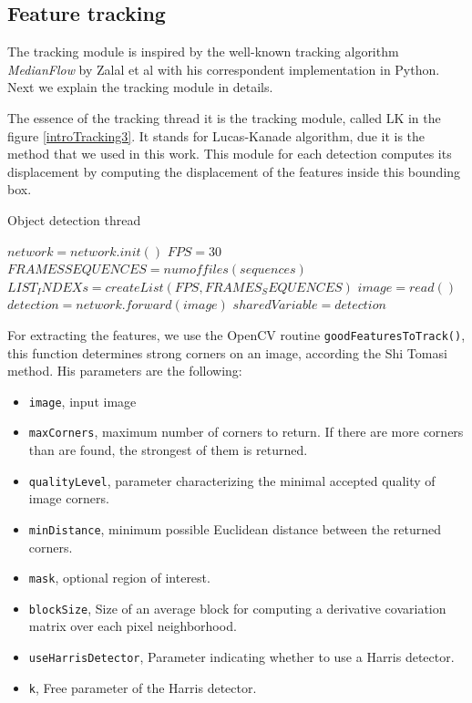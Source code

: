 \subsection{Feature tracking}


The tracking module is inspired by the well-known tracking algorithm \textit{MedianFlow} by Zalal et al\cite{medianFlow} with his correspondent implementation in Python\cite{medianFlowPython}. Next we explain the tracking module in details.



The essence of the tracking thread it is the tracking module, called LK in the figure \ref{introTracking3}. It stands for Lucas-Kanade algorithm, due it is the method that we used in this work. This module for each detection computes its displacement by computing the displacement of the features inside this bounding box.





\begin{algorithm}
\caption{Object detection thread}\label{euclid}
\begin{algorithmic}[1]
\State $network = network.init()$
\State $FPS = 30$
\State $FRAMES SEQUENCES = num of files(sequences)$
\State $LIST_INDEXs = createList(FPS,FRAMES_SEQUENCES)$
\State $image = read()$
\State $detection = network.forward(image)$
\State $sharedVariable = detection$
\EndFor
\EndProcedure
\end{algorithmic}
\end{algorithm}



For extracting the features, we use the OpenCV routine \texttt{goodFeaturesToTrack()}, this function determines strong corners on an image, according the Shi Tomasi method. His parameters are the following:
 
\begin{itemize}

\item \texttt{image}, input image

\item \texttt{maxCorners}, maximum number of corners to return. If there are more corners than are found, the strongest of them is returned.
\item \texttt{qualityLevel}, parameter characterizing the minimal accepted quality of image corners.
\item \texttt{minDistance}, minimum possible Euclidean distance between the returned corners.
\item \texttt{mask}, optional region of interest.
\item \texttt{blockSize}, Size of an average block for computing a derivative covariation matrix over each pixel neighborhood.
\item \texttt{useHarrisDetector},  Parameter indicating whether to use a Harris detector.
\item \texttt{k},  Free parameter of the Harris detector.

\end{itemize}


